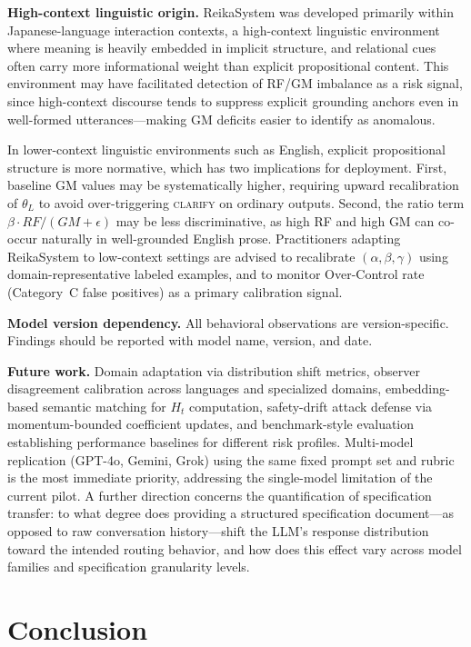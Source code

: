 \documentclass[11pt,a4paper]{article}
\begin{document}
\textbf{High-context linguistic origin.} ReikaSystem was developed primarily within
Japanese-language interaction contexts, a high-context linguistic environment where meaning
is heavily embedded in implicit structure, and relational cues often carry more informational
weight than explicit propositional content. This environment may have facilitated detection
of RF/GM imbalance as a risk signal, since high-context discourse tends to suppress
explicit grounding anchors even in well-formed utterances---making GM deficits easier
to identify as anomalous.

In lower-context linguistic environments such as English, explicit propositional structure
is more normative, which has two implications for deployment. First, baseline GM values
may be systematically higher, requiring upward recalibration of $\theta_L$ to avoid
over-triggering \textsc{clarify} on ordinary outputs. Second, the ratio term
$\beta \cdot RF/(GM+\epsilon)$ may be less discriminative, as high RF and high GM
can co-occur naturally in well-grounded English prose. Practitioners adapting
ReikaSystem to low-context settings are advised to recalibrate $(\alpha, \beta, \gamma)$
using domain-representative labeled examples, and to monitor Over-Control rate
(Category~C false positives) as a primary calibration signal.

\textbf{Model version dependency.} All behavioral observations are version-specific.
Findings should be reported with model name, version, and date.

\textbf{Future work.} Domain adaptation via distribution shift metrics, observer disagreement
calibration across languages and specialized domains, embedding-based semantic matching for
$H_t$ computation, safety-drift attack defense via momentum-bounded coefficient updates,
and benchmark-style evaluation establishing performance baselines for different risk profiles.
Multi-model replication (GPT-4o, Gemini, Grok) using the same fixed prompt set and rubric
is the most immediate priority, addressing the single-model limitation of the current pilot.
A further direction concerns the quantification of specification transfer: to what degree does
providing a structured specification document---as opposed to raw conversation history---shift
the LLM's response distribution toward the intended routing behavior, and how does this effect
vary across model families and specification granularity levels.

\section{Conclusion}
\end{document}
